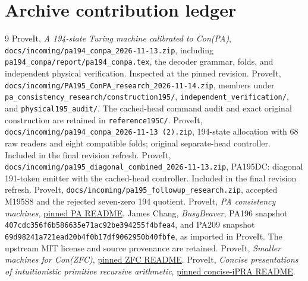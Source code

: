 \documentclass[11pt]{article}
\newcommand{\file}[1]{{\small\nolinkurl{#1}}}
\begin{document}
\clearpage
\section{Archive contribution ledger}\label{app:ledger}


\begin{thebibliography}{9}
 ProveIt, \emph{A 194-state Turing machine calibrated to
Con(PA)}, \file{docs/incoming/pa194_conpa_2026-11-13.zip}, including
\file{pa194_conpa/report/pa194_conpa.tex}, the decoder grammar, folds,
and independent physical verification. Inspected at the pinned revision.
 ProveIt, \file{docs/incoming/PA195_ConPA_research_2026-11-14.zip},
members under \file{pa_consistency_research/construction195/},
\file{independent_verification/}, and \file{physical195_audit/}.
The cached-head command audit and exact original construction are retained
in \file{reference195C/}.
 ProveIt, \file{docs/incoming/pa194_conpa_2026-11-13 (2).zip},
194-state allocation with 68 raw readers and eight compatible folds;
original separate-head controller. Included in the final revision refresh.
 ProveIt, \file{docs/incoming/pa195_diagonal_combined_2026-11-13.zip},
PA195DC: diagonal 191-token emitter with the cached-head controller.
Included in the final revision refresh.
 ProveIt, \file{docs/incoming/pa195_followup_research.zip},
accepted M195S8 and the rejected seven-zero 194 quotient.
 ProveIt, \emph{PA consistency machines},
\href{https://github.com/VladimirReshetnikov/ProveIt/blob/768c2be1a8e4d2fcf8aa3443c7b0f084d145734c/Computability/BusyBeaver/Research/PA/README.md}{pinned PA README}.
 James Chang, \emph{BusyBeaver}, PA196 snapshot
\texttt{407cdc356f6b586635e71ac92be394255f4bfea4}, and PA209 snapshot
\texttt{69d98241a721ead20b4f0b17df9062950b40fbfe}, as imported in ProveIt.
The upstream MIT license and source provenance are retained.
 ProveIt, \emph{Smaller machines for Con(ZFC)},
\href{https://github.com/VladimirReshetnikov/ProveIt/blob/768c2be1a8e4d2fcf8aa3443c7b0f084d145734c/Computability/BusyBeaver/Research/ZFC/README.md}{pinned ZFC README}.
 ProveIt, \emph{Concise presentations of intuitionistic
primitive recursive arithmetic},
\href{https://github.com/VladimirReshetnikov/ProveIt/blob/768c2be1a8e4d2fcf8aa3443c7b0f084d145734c/Logic/PrimitiveRecursiveArithmetic/ConciseIPRA/README.md}{pinned concise-iPRA README}.
\end{thebibliography}
\end{document}
